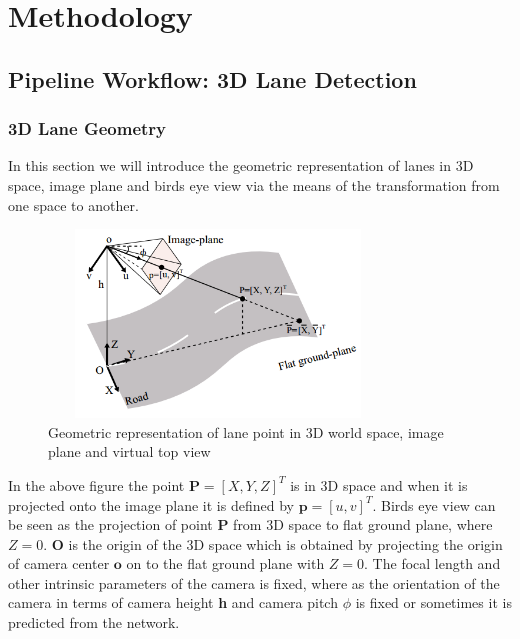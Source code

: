 

    \chapter{Methodology}

    \section{Pipeline Workflow: 3D Lane Detection }
        
        \subsection{3D Lane Geometry}
        In this section we will introduce the geometric representation of lanes in 3D space, image plane and birds eye view via the means of the transformation from one space to another. 
        
         \begin{figure}[h]
    \centering
    \includegraphics[width=9cm, height=5cm]{images/3d_lane_geometry.png}
    \caption{Geometric representation of lane point in 3D world space, image plane and virtual top view \cite{DBLP:journals/corr/abs-2112-15351}}
    \end{figure}
    
    In the above figure the point $\textbf{P} =[X, Y, Z]^{T}$ is in 3D space and when it is projected onto the image plane it is defined by $\textbf{p} = [u, v]^{T}$. Birds eye view can be seen as the projection of point $\textbf{P}$ from 3D space to flat ground plane, where $Z=0$. $\textbf{O}$ is the origin of the 3D space which is obtained by projecting the origin of camera center $\textbf{o}$ on to the flat ground plane with $Z = 0$. The focal length and other intrinsic parameters of the camera is fixed, where as the orientation of the camera in terms of camera height \textbf{h}  and camera pitch \textbf{$\phi$} is fixed or sometimes it is predicted from the network. 
    
